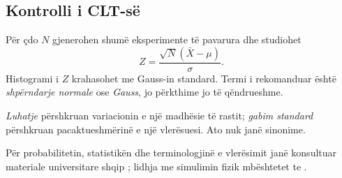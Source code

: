 \subsection{Kontrolli i CLT-së}
Për çdo $N$ gjenerohen shumë eksperimente të pavarura dhe studiohet
\begin{equation}
 Z=\frac{\sqrt N(\bar X-\mu)}{\sigma}.
\end{equation}
Histogrami i $Z$ krahasohet me Gauss-in standard. Termi i rekomanduar është \emph{shpërndarje normale} ose \emph{Gauss}, jo përkthime jo të qëndrueshme.

\begin{kujdes}
\emph{Luhatje} përshkruan variacionin e një madhësie të rastit; \emph{gabim standard} përshkruan pacaktueshmërinë e një vlerësuesi. Ato nuk janë sinonime.
\end{kujdes}

Për probabilitetin, statistikën dhe terminologjinë e vlerësimit janë konsultuar materiale universitare shqip \cite{capollari,butka,tasho}; lidhja me simulimin fizik mbështetet te \cite{newman,landau}.
